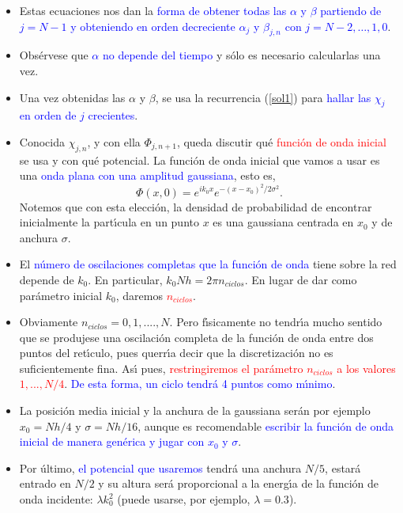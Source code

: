 \documentclass[12pt]{iopart}
\def\az{\textcolor{blue}}
\def\ro{\textcolor{red}}
\begin{document}
\begin{itemize}
\item Estas ecuaciones nos dan la \az{forma de obtener todas las $\alpha$ y $\beta$
partiendo de $j=N-1$ y obteniendo en orden decreciente $\alpha_{j}$ y
$\beta_{j,n}$ con  $j=N-2, \ldots,1,0$}. 

\item Obs\'ervese que \az{$\alpha$ no depende del tiempo} y s\'olo es necesario calcularlas una vez.

\item Una vez obtenidas las $\alpha$ y $\beta$, se usa la recurrencia (\ref{sol1}) para \az{hallar las $\chi_j$ en orden de $j$
crecientes}.

\item Conocida  $\chi_{j,n}$, y con ella $\Phi_{j,n+1}$, queda discutir qu\'e \ro{funci{\'o}n de onda inicial} se usa 
y con qu\'e potencial. La funci{\'o}n de onda inicial que vamos a usar es una \az{onda plana con una amplitud gaussiana}, esto es,
%
\begin{equation}
\Phi(x,0)=e^{ik_0x}e^{-(x-x_0)^2/2\sigma^2}.
\end{equation}
%
Notemos que con esta elecci{\'o}n, la densidad de  probabilidad de encontrar inicialmente la part{\'\i}cula en un punto $x$ es
una gaussiana centrada en $x_0$ y de anchura $\sigma$. 

\item El \az{n{\'u}mero de oscilaciones completas que la funci{\'o}n de onda} tiene
sobre la red depende de $k_0$. En particular, $k_0Nh=2\pi n_{ciclos}$. En lugar de dar como par{\'a}metro inicial $k_0$, daremos
\ro{$n_{ciclos}$}. 

\item Obviamente $n_{ciclos}=0,1,....,N$. Pero f{\'\i}sicamente no tendr{\'\i}a mucho sentido que se produjese una 
oscilaci{\'o}n completa de la funci{\'o}n de onda  entre dos puntos del ret{\'\i}culo, pues querr{\'\i}a decir que la
discretizaci\'on no es suficientemente fina. As\'{\i} pues, \ro{restringiremos el par{\'a}metro $n_{ciclos}$ a los valores 
$1,...,N/4$}. \az{De esta forma, un ciclo tendr\'a 4 puntos como m{\'\i}nimo}. 

\item La posici{\'o}n media inicial y la anchura de
la gaussiana ser\'an por ejemplo $x_0=Nh/4$ y  $\sigma=Nh/16$, aunque es recomendable \az{escribir la funci\'on de 
onda inicial de manera gen\'erica y jugar con $x_0$ y $\sigma$}.
 
\item Por {\'u}ltimo, \az{el potencial que usaremos} tendr\'a una anchura $N/5$, estar\'a entrado en $N/2$ y su altura ser\'a proporcional a 
la energ{\'\i}a de la funci{\'o}n de onda incidente: $\lambda k_0^2$ (puede usarse, por ejemplo, $\lambda=0.3$).


\end{itemize}
\end{document}
